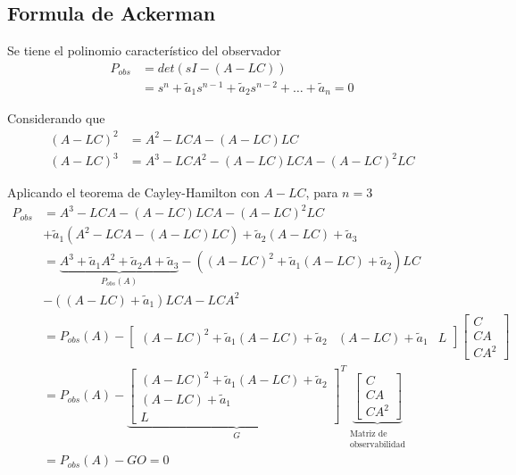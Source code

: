 \subsection{Formula de Ackerman}

Se tiene el polinomio característico del observador 
\[
    \begin{split}
        P_{obs} & = det(sI-(A-LC)) \\
        & = s^{n} + \tilde{a}_{1}s^{n-1} + \tilde{a}_{2}s^{n-2} + \ldots + \tilde{a}_{n} = 0
    \end{split}
\]

Considerando que 
\[
    \begin{split}
        (A-LC)^{2} & = A^{2} - LCA - (A-LC)LC \\
        (A-LC)^{3} & = A^{3} - LCA^{2} - (A-LC)LCA - (A-LC)^{2}LC 
    \end{split}
\]

Aplicando el teorema de Cayley-Hamilton con \( A-LC \), para \( n=3 \)
\[
    \begin{split}
        P_{obs} & = A^{3} -LCA - (A-LC)LCA - (A-LC)^{2}LC \\
        & + \tilde{a}_{1}(A^{2}-LCA- (A-LC)LC) + \tilde{a}_{2}(A-LC) + \tilde{a}_{3} \\
        & = \underbrace{A^{3} + \tilde{a}_{1}A^{2} + \tilde{a}_{2}A + \tilde{a}_{3}}_{P_{obs}(A)} - ((A-LC)^{2} + \tilde{a}_{1}(A-LC) + \tilde{a}_{2})LC \\
        &- ((A-LC) + \tilde{a}_{1})LCA -LCA^{2} \\
        & = P_{obs}(A) - 
        \begin{bmatrix}
            (A-LC)^{2} + \tilde{a}_{1}(A-LC) + \tilde{a}_{2} &
            (A-LC) + \tilde{a}_{1} &
            L
        \end{bmatrix}
        \begin{bmatrix}
            C \\ CA \\ CA^{2}
        \end{bmatrix} \\
        & = P_{obs}(A) -
        \underbrace{
        \begin{bmatrix}
            (A-LC)^{2} + \tilde{a}_{1}(A-LC) + \tilde{a}_{2} \\
            (A-LC) + \tilde{a}_{1} \\
            L
        \end{bmatrix}^{T}}_{G}
        \underbrace{
        \begin{bmatrix}
            C \\ CA \\ CA^{2}
        \end{bmatrix}}_{
        \begin{matrix}
            \text{Matriz de} \\
            \text{observabilidad}
        \end{matrix}
        } \\
        & = P_{obs}(A) -GO = 0
    \end{split}
\]

